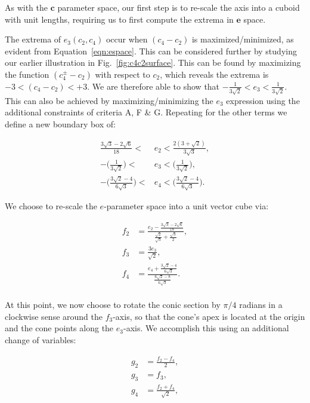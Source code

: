 As with the $\mathbf{c}$ parameter space, our first step is to re-scale the
axis into a cuboid with unit lengths, requiring us to first compute the extrema
in $\mathbf{e}$ space.

The extrema of $e_3(c_2,c_4)$ occur when $(c_4-c_2)$ is maximized/minimized,
as evident from Equation~\ref{eqn:espace}. This can be considered further by 
studying our earlier illustration in Fig.~\ref{fig:c4c2surface}. This can be 
found by maximizing the function $(c_4^{\pm}-c_2)$ with respect to $c_2$, which 
reveals the extrema is $-3<(c_4-c_2)<+3$. We are therefore able to show that 
$-\frac{1}{3\sqrt{2}}<e_3<\frac{1}{3\sqrt{2}}$. This can also be achieved by
maximizing/minimizing the $e_3$ expression using the additional constraints of
criteria A, F \& G. Repeating for the other terms we define a new boundary box
of:

\begin{align}
\frac{ 3\sqrt{3} - 2\sqrt{6} }{ 18 } < &e_2 < \frac{ 2 (3+\sqrt{2}) }{ 3 \sqrt{3} },\\
-\Bigg(\frac{1}{3\sqrt{2}}\Bigg) < &e_3 < \Bigg(\frac{1}{3\sqrt{2}}\Bigg),\\
-\Bigg(\frac{ 3\sqrt{2} - 4 }{ 6\sqrt{3} }\Bigg) < &e_4 < \Bigg(\frac{ 3\sqrt{2} - 4 }{ 6\sqrt{3} }\Bigg).
\end{align}

We choose to re-scale the $e$-parameter space into a unit vector cube via:

\begin{align}
f_2 &= \frac{ e_2 - \frac{ 3\sqrt{3} - 2\sqrt{6} }{ 18 } }{ \frac{\sqrt{2}}{\sqrt{3}} + \frac{\sqrt{3}}{2} } ,\\
f_3 &= \frac{ 3 e_3 }{ \sqrt{2} },\\
f_4 &= \frac{ e_4 + \frac{ 3\sqrt{2} - 4 }{ 6\sqrt{3} } }{ \frac{ 6\sqrt{2} - 8 }{ 6\sqrt{3} } }.\\
\end{align}

At this point, we now choose to rotate the conic section by $\pi/4$ radians
in a clockwise sense around the $f_3$-axis, so that the cone's apex is located
at the origin and the cone points along the $e_3$-axis. We accomplish this using
an additional change of variables:

\begin{align}
g_2 &= \frac{f_2-f_4}{2},\\
g_3 &= f_3,\\
g_4 &= \frac{f_2+f_4}{\sqrt{2}},
\end{align}

